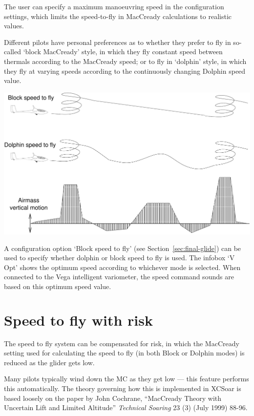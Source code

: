 \documentclass[a4paper,12pt]{refrep}
\begin{document}
The user can specify a maximum manoeuvring speed in the configuration
settings, which limits the speed-to-fly in MacCready calculations to
realistic values.

Different pilots have personal preferences as to whether they prefer
to fly in so-called `block MacCready' style, in which they fly
constant speed between thermals according to the MacCready speed; or
to fly in `dolphin' style, in which they fly at varying speeds
according to the continuously changing Dolphin speed value.

\begin{maxipage}
\begin{center}
\includegraphics[angle=0,width=0.8\linewidth,keepaspectratio='true']{figures/blockmc.pdf}
\end{center}
\end{maxipage}

A configuration option `Block speed to fly' (see
Section~\ref{sec:final-glide}) can be used to specify whether dolphin
or block speed to fly is used.  The infobox `V Opt' shows the optimum
speed according to whichever mode is selected.  When connected to the
Vega intelligent variometer, the speed command sounds are based on
this optimum speed value.

\section{Speed to fly with risk}\label{sec:speed-fly-with}
  The speed to fly system can be compensated for risk, in which the
  MacCready setting used for calculating the speed to fly (in both
  Block or Dolphin modes) is reduced as the glider gets low.

  Many pilots typically wind down the MC as they get low --- this
  feature performs this automatically.  The theory governing how this
  is implemented in XCSoar is based loosely on the paper by John
  Cochrane, ``MacCready Theory with Uncertain Lift and Limited
  Altitude'' {\em Technical Soaring} 23 (3) (July 1999) 88-96.
\end{document}
